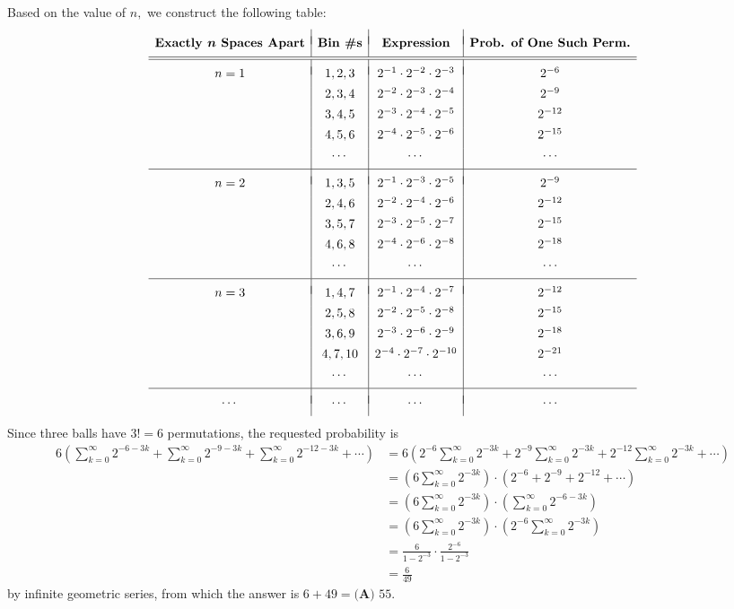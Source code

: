 \begin{enumerate}
Based on the value of $n,$ we construct the following table:
 \[\begin{array}{c|c|c|c}  & & & \\ [-1.5ex] \textbf{Exactly }\boldsymbol{n}\textbf{ Spaces Apart} & \textbf{Bin \#s} & \textbf{Expression} & \textbf{Prob. of One Such Perm.} \\ [1ex]  \hline\hline   & & & \\ [-1.5ex]  n=1 & 1,2,3 & 2^{-1}\cdot2^{-2}\cdot2^{-3} & 2^{-6} \\ [1ex]   & 2,3,4 & 2^{-2}\cdot2^{-3}\cdot2^{-4} & 2^{-9} \\ [1ex]   & 3,4,5 & 2^{-3}\cdot2^{-4}\cdot2^{-5} & 2^{-12} \\ [1ex]   & 4,5,6 & 2^{-4}\cdot2^{-5}\cdot2^{-6} & 2^{-15} \\ [1ex]   & \cdots & \cdots & \cdots \\ [1ex]  \hline  & & & \\ [-1.5ex]  n=2 & 1,3,5 & 2^{-1}\cdot2^{-3}\cdot2^{-5} & 2^{-9} \\ [1ex]   & 2,4,6 & 2^{-2}\cdot2^{-4}\cdot2^{-6} & 2^{-12} \\ [1ex]   & 3,5,7 & 2^{-3}\cdot2^{-5}\cdot2^{-7} & 2^{-15} \\ [1ex]   & 4,6,8 & 2^{-4}\cdot2^{-6}\cdot2^{-8} & 2^{-18} \\ [1ex]   & \cdots & \cdots & \cdots \\ [1ex]  \hline  & & & \\ [-1.5ex]  n=3 & 1,4,7 & 2^{-1}\cdot2^{-4}\cdot2^{-7} & 2^{-12} \\ [1ex]   & 2,5,8 & 2^{-2}\cdot2^{-5}\cdot2^{-8} & 2^{-15} \\ [1ex]   & 3,6,9 & 2^{-3}\cdot2^{-6}\cdot2^{-9} & 2^{-18} \\ [1ex]  & 4,7,10 & 2^{-4}\cdot2^{-7}\cdot2^{-10} & 2^{-21} \\ [1ex]  & \cdots & \cdots & \cdots \\ [1ex]  \hline   & & & \\ [-1.5ex]    \cdots & \cdots & \cdots & \cdots \\ [1ex] \end{array}\]Since three balls have $3!=6$ permutations, the requested probability is
 \begin{align*} 6\left(\sum_{k=0}^{\infty}2^{-6-3k}+\sum_{k=0}^{\infty}2^{-9-3k}+\sum_{k=0}^{\infty}2^{-12-3k}+\cdots\right)&=6\left(2^{-6}\sum_{k=0}^{\infty}2^{-3k}+2^{-9}\sum_{k=0}^{\infty}2^{-3k}+2^{-12}\sum_{k=0}^{\infty}2^{-3k}+\cdots\right) \\ &=\left(6\sum_{k=0}^{\infty}2^{-3k}\right)\cdot\left(2^{-6}+2^{-9}+2^{-12}+\cdots\right) \\ &=\left(6\sum_{k=0}^{\infty}2^{-3k}\right)\cdot\left(\sum_{k=0}^{\infty}2^{-6-3k}\right) \\ &=\left(6\sum_{k=0}^{\infty}2^{-3k}\right)\cdot\left(2^{-6}\sum_{k=0}^{\infty}2^{-3k}\right) \\ &=\frac{6}{1-2^{-3}}\cdot\frac{2^{-6}}{1-2^{-3}} \\ &=\frac{6}{49} \end{align*}
by infinite geometric series, from which the answer is $6+49=\boxed{\textbf{(A) }55}.$




\end{enumerate}
